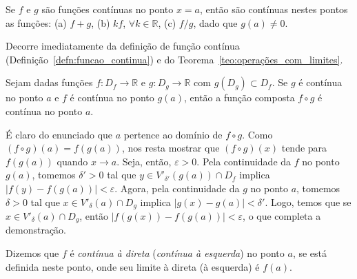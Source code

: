\begin{teo}
  Se $f$ e $g$ são funções contínuas no ponto $x=a$, então são contínuas nestes pontos as funções: (a) $f+g$, (b) $kf$, $\forall k\in\mathbb{R}$, (c) $f/g$, dado que $g(a)\neq 0$.
\end{teo}
\begin{dem}
  Decorre imediatamente da definição de função contínua (Definição~\ref{defn:funcao_continua}) e do Teorema~\ref{teo:operações_com_limites}.
\end{dem}

\begin{teo}
  Sejam dadas funções $f:D_f\to\mathbb{R}$ e $g:D_g\to\mathbb{R}$ com $g(D_g)\subset D_f$. Se $g$ é contínua no ponto $a$ e $f$ é contínua no ponto $g(a)$, então a função composta $f\circ g$ é contínua no ponto $a$.
\end{teo}
\begin{dem}
  É claro do enunciado que $a$ pertence ao domínio de $f\circ g$. Como $(f\circ g)(a) = f(g(a))$, nos resta mostrar que $(f\circ g)(x)$ tende para $f(g(a))$ quando $x\to a$. Seja, então, $\varepsilon>0$. Pela continuidade da $f$ no ponto $g(a)$, tomemos $\delta'>0$ tal que $y\in V'_{\delta'}(g(a))\cap D_f$ implica $|f(y)-f(g(a))|<\varepsilon$. Agora, pela continuidade da $g$ no ponto $a$, tomemos $\delta>0$ tal que $x\in V'_{\delta}(a)\cap D_g$ implica $|g(x)-g(a)|<\delta'$. Logo, temos que se $x\in V'_{\delta}(a)\cap D_g$, então $|f(g(x))-f(g(a))|<\varepsilon$, o que completa a demonstração.
\end{dem}

\begin{defn}
  Dizemos que $f$ é \emph{contínua à direta} (\emph{contínua à esquerda}) no ponto $a$, se está definida neste ponto, onde seu limite à direta (à esquerda) é $f(a)$.
\end{defn}

